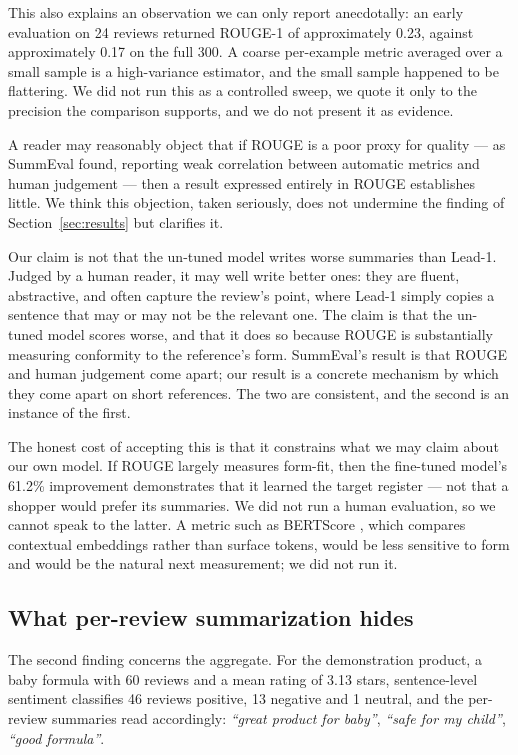 This also explains an observation we can only report anecdotally: an early
evaluation on 24 reviews returned ROUGE-1 of approximately 0.23, against
approximately 0.17 on the full 300. A coarse per-example metric averaged over a
small sample is a high-variance estimator, and the small sample happened to be
flattering. We did not run this as a controlled sweep, we quote it only to the
precision the comparison supports, and we do not present it as evidence.

A reader may reasonably object that if ROUGE is a poor proxy for quality --- as
SummEval \cite{fabbri2021summeval} found, reporting weak correlation between
automatic metrics and human judgement --- then a result expressed entirely in
ROUGE establishes little. We think this objection, taken seriously, does not
undermine the finding of Section~\ref{sec:results} but clarifies it.

Our claim is not that the un-tuned model writes worse summaries than Lead-1.
Judged by a human reader, it may well write better ones: they are fluent,
abstractive, and often capture the review's point, where Lead-1 simply copies a
sentence that may or may not be the relevant one. The claim is that the
un-tuned model scores worse, and that it does so because ROUGE is substantially
measuring conformity to the reference's form. SummEval's result is that ROUGE
and human judgement come apart; our result is a concrete mechanism by which
they come apart on short references. The two are consistent, and the second is
an instance of the first.

The honest cost of accepting this is that it constrains what we may claim about
our own model. If ROUGE largely measures form-fit, then the fine-tuned model's
61.2\% improvement demonstrates that it learned the target register --- not
that a shopper would prefer its summaries. We did not run a human evaluation,
so we cannot speak to the latter. A metric such as BERTScore
\cite{zhang2020bertscore}, which compares contextual embeddings rather than
surface tokens, would be less sensitive to form and would be the natural next
measurement; we did not run it.

\subsection{What per-review summarization hides}

The second finding concerns the aggregate. For the demonstration product, a
baby formula with 60 reviews and a mean rating of 3.13 stars, sentence-level
sentiment classifies 46 reviews positive, 13 negative and 1 neutral, and the
per-review summaries read accordingly: \emph{``great product for baby''},
\emph{``safe for my child''}, \emph{``good formula''}.

